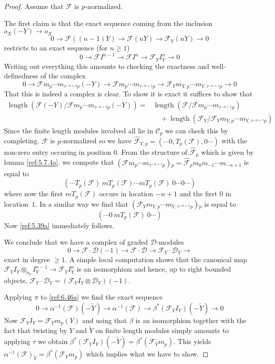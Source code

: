 \documentclass{amsproc}
\def\Cscr{{\mathcal C}}
\def\Dscr{{\mathcal D}}
\def\Fscr{{\mathcal F}}
\def\r{\rightarrow}
\DeclareMathOperator{\length}{length}
\theoremstyle{definition}
\theoremstyle{remark}
\numberwithin{equation}{section}
\numberwithin{table}{section}
\numberwithin{figure}{section}
\begin{document}
\begin{proof}
  Assume that $\Fscr$ is $p$-normalized.
  
  The first claim is that the exact sequence coming from the inclusion
  $o_X(-Y)\r o_X$
\[
0\r \Fscr((n-1)Y)\r \Fscr(nY)\r \Fscr_Y (nY)\r 0
\]
  restricts to an exact sequence
(for $n\ge 1$)
\[
0\r \Fscr I^{n-1} \r \Fscr I^n \r \Fscr_Y I_{Y}^n\r 0
\]
 Writing out everything this amounts to
checking the exactness and well-definedness of the complex
\[
0\r \Fscr m_p\cdots m_{\tau^{-n+2} p} (-Y)\r 
\Fscr m_p\cdots m_{\tau^{-n+1} p} \r
\Fscr_Y m_{Y,p}\cdots m_{Y,\tau^{-n+1} p} \r 0
\]
That this is indeed a complex is clear. To show it is exact it
suffices to show that
\begin{equation}
\label{ref:6.45a}
\begin{split}
\length(\Fscr(-Y)/ \Fscr m_p\cdots m_{\tau^{-n+2} p} (-Y))=&
\length(\Fscr/\Fscr m_p\cdots m_{\tau^{-n+1} p}
)\\
&\quad+
\length(\Fscr_Y /\Fscr_Y m_{Y,p}\cdots m_{Y,\tau^{-n+1} p})
\end{split}
\end{equation}
Since the finite length modules involved all lie in $\Cscr_p$ we can
check this by completing.   $\Fscr$ is $p$-normalized so we have $
\hat{\Fscr}_{Y,p}=(\cdots 0, T_p(\Fscr),0\cdots) $ with the non-zero
entry occuring in position $0$.  From the structure of
$\hat{\Fscr}_p$ which is given by lemma \ref{ref:5.7.4a}. 
we   compute that
$(\Fscr m_p\cdots m_{\tau^{-n+1} p})\hat{}_p=\hat{\Fscr}_p m_0 m_{-1}\cdots
m_{-n+1}
$
is equal to
\[
(\cdots T_p(\Fscr)  \ mT_p(\Fscr) \cdots mT_p(\Fscr) \ 0\cdots
0\cdots)
\]
where now the first $mT_p(\Fscr)$ occurs in location $-n+1$ and the
first $0$ in location~$1$.
In a similar way we find that  $(\Fscr_Y m_{Y,p}\cdots m_{Y,\tau^{-n+1}
  p})\hat{}_p$ is equal to
\[
(\cdots 0\ m T_p(\Fscr)\ 0\cdots)
\]
Now \eqref{ref:5.39a} immediately follows.

We conclude that we have a complex of graded $\Dscr$-modules
\begin{equation}
\label{ref:6.46a}
0\r \Fscr\cdot \Dscr (-1) \r  \Fscr\cdot \Dscr \r \Fscr_Y\cdot
\Dscr_Y\r 
\end{equation}
exact in degree $\ge 1$. A simple local computation shows that the
canonical map $\Fscr_YI_{Y}\otimes_{o_Y}
I^{n-1}_{Y}\r\Fscr_YI^n_{Y}$ is an isomorphism and hence, up to right
bounded objects, $\Fscr_Y\cdot\Dscr_Y=(\Fscr_Y I_Y\otimes\Dscr_Y)(-1)$.

Applying $\pi$ to  \eqref{ref:6.46a} we find the exact sequence 
\[
0\r \alpha^{-1}(\Fscr)(-\tilde{Y})\r \alpha^{-1}(\Fscr)\r
\beta^\ast(\Fscr_Y I_{Y})(-\tilde{Y})\r 0
\]
Now $\Fscr_Y I_Y=\Fscr_Y m_p (Y)$ and using that $\beta$ is an isomorphism
together with the fact that twisting by $Y$ and $\tilde{Y}$ on finite
length modules 
simply
amounts to applying $\tau$ 
we obtain
$\beta^\ast(\Fscr_Y I_Y)(-\tilde{Y})=\beta^\ast(\Fscr_Y m_p)$.
This yields 
$\alpha^{-1}(\Fscr)_{\tilde{Y}}=\beta^\ast(\Fscr_Y m_p)$ which
implies what we have to show. 
\end{proof}
\end{document}

